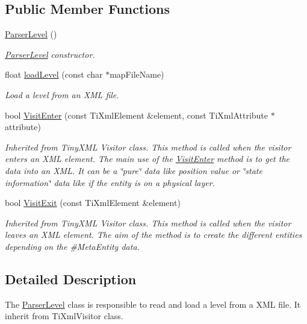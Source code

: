 \subsection*{Public Member Functions}
\begin{DoxyCompactItemize}
\item 
\hyperlink{struct_symp_1_1_parser_level_a527575abc327361a4a3f6331d09a8ee5}{Parser\-Level} ()
\begin{DoxyCompactList}\small\item\em \hyperlink{struct_symp_1_1_parser_level_a527575abc327361a4a3f6331d09a8ee5}{Parser\-Level} constructor. \end{DoxyCompactList}\item 
float \hyperlink{struct_symp_1_1_parser_level_a73d3f7b58919f202224353b774440c12}{load\-Level} (const char $\ast$map\-File\-Name)
\begin{DoxyCompactList}\small\item\em Load a level from an X\-M\-L file. \end{DoxyCompactList}\item 
bool \hyperlink{struct_symp_1_1_parser_level_a4292eb4e5b4104543ef1b65b83b2d047}{Visit\-Enter} (const Ti\-Xml\-Element \&element, const Ti\-Xml\-Attribute $\ast$attribute)
\begin{DoxyCompactList}\small\item\em Inherited from Tiny\-X\-M\-L Visitor class. This method is called when the visitor enters an X\-M\-L element. The main use of the \hyperlink{struct_symp_1_1_parser_level_a4292eb4e5b4104543ef1b65b83b2d047}{Visit\-Enter} method is to get the data into an X\-M\-L. It can be a \char`\"{}pure\char`\"{} data like position value or \char`\"{}state information\char`\"{} data like if the entity is on a physical layer. \end{DoxyCompactList}\item 
bool \hyperlink{struct_symp_1_1_parser_level_a7d10cbbe06eb6f8b877d83b8b92d8c31}{Visit\-Exit} (const Ti\-Xml\-Element \&element)
\begin{DoxyCompactList}\small\item\em Inherited from Tiny\-X\-M\-L Visitor class. This method is called when the visitor leaves an X\-M\-L element. The aim of the method is to create the different entities depending on the \#\-Meta\-Entity data. \end{DoxyCompactList}\end{DoxyCompactItemize}


\subsection{Detailed Description}
The \hyperlink{struct_symp_1_1_parser_level_a527575abc327361a4a3f6331d09a8ee5}{Parser\-Level} class is responsible to read and load a level from a X\-M\-L file. It inherit from Ti\-Xml\-Visitor class. 

